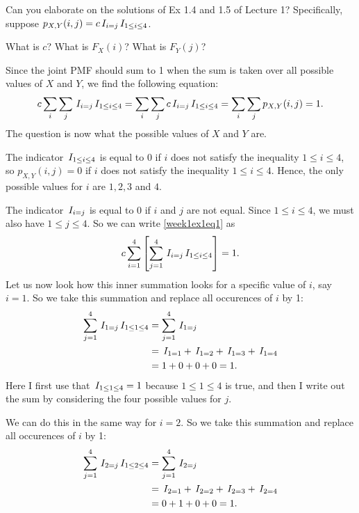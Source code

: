 \documentclass[a4paper,11pt]{article}
\begin{document}
\begin{exercise}
Can you elaborate on the solutions of Ex 1.4 and 1.5 of Lecture 1? 
Specifically, suppose $p_{X,Y}(i,j) = c \,I_{i=j}\,I_{1\leq i \leq 4}$. 

What is $c$? What is $F_{X}(i)$? What is $F_{Y}(j)$?

\begin{solution}
Since the joint PMF should sum to 1 when the sum is taken over all possible values of $X$ and $Y$, we find the following equation: 
\begin{equation}
c \sum_i \sum_j \,I_{i=j}\,I_{1\leq i \leq 4}  = \sum_i \sum_j c \,I_{i=j}\,I_{1\leq i \leq 4} =   \sum_i \sum_j p_{X,Y}(i,j) = 1. \label{week1ex1eq1}
\end{equation}
The question is now what the  possible values of $X$ and $Y$ are. 

The indicator $\,I_{1\leq i \leq 4}$ is equal to 0 if $i$ does not satisfy the inequality $1\leq i \leq 4$, so  $p_{X,Y}(i,j) = 0$ if  $i$ does not satisfy the inequality $1\leq i \leq 4$. Hence, the only possible values for $i$ are $1, 2, 3$ and $4$.

The indicator $\,I_{i=j}$ is equal to 0 if $i$ and $j$ are not equal. Since $1\leq i \leq 4$, we must also have $1\leq j \leq 4$. So we can write \eqref{week1ex1eq1} as
\begin{equation}
c \sum_{i=1}^4 \left[\sum_{j=1}^4 \,I_{i=j}\,I_{1\leq i \leq 4}\right]  = 1.  \label{week1ex1eq2}
\end{equation}
Let us now look how this inner summation looks for a specific value of $i$, say $i=1$. So we take this summation and replace all occurences of $i$ by 1:
\begin{align*}
\sum_{j=1}^4 \,I_{1=j}\,I_{1\leq 1 \leq 4} &=  \sum_{j=1}^4 \,I_{1=j} \\
&= \,I_{1=1} + \,I_{1=2} + \,I_{1=3}+ \,I_{1=4} \\
&= 1 + 0 + 0 + 0 = 1.
\end{align*}
Here I first use that $\,I_{1\leq 1 \leq 4}  = 1$ because $1\leq 1 \leq 4$ is true, and then I write out the sum by considering the four possible values 
for $j$. 

We can do this in the same way for $i=2$. So we take this summation and replace all occurences of $i$ by 1:
\begin{align*}
\sum_{j=1}^4 \,I_{2=j}\,I_{1\leq 2 \leq 4} &=  \sum_{j=1}^4 \,I_{2=j} \\
&= \,I_{2=1} + \,I_{2=2} + \,I_{2=3}+ \,I_{2=4} \\
&= 0 + 1 + 0 + 0 = 1.
\end{align*}


\end{solution}
\end{exercise}
\end{document}
